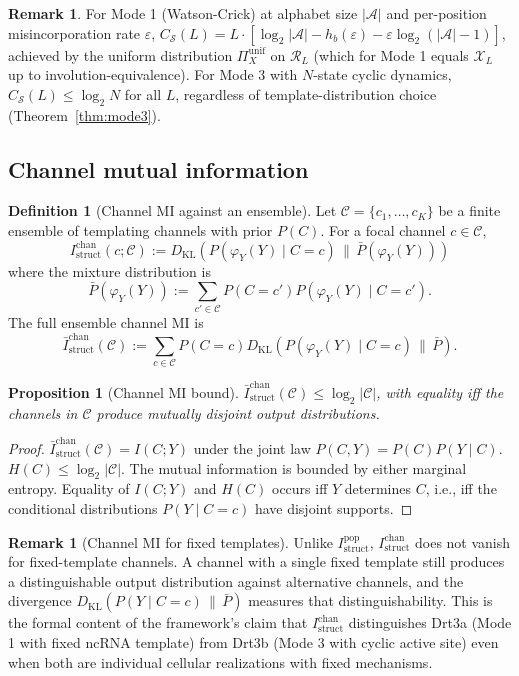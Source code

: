 \documentclass[11pt]{article}
\theoremstyle{plain}
\newtheorem{proposition}[theorem]{Proposition}
\theoremstyle{definition}
\newtheorem{definition}[theorem]{Definition}
\newtheorem{remark}[theorem]{Remark}
\newcommand{\Istructpop}{I_{\mathrm{struct}}^{\mathrm{pop}}}
\newcommand{\Istructchan}{I_{\mathrm{struct}}^{\mathrm{chan}}}
\newcommand{\Csub}{C_{\mathcal{S}}}
\newcommand{\Hbin}{h_b}
\newcommand{\descY}{\varphi_Y}
\newcommand{\KL}[2]{D_{\mathrm{KL}}\!\left(#1 \,\|\, #2\right)}
\begin{document}
\begin{remark}
For Mode 1 (Watson-Crick) at alphabet size $|\mathcal{A}|$ and per-position misincorporation rate $\varepsilon$, $\Csub(L) = L \cdot \left[ \log_2 |\mathcal{A}| - \Hbin(\varepsilon) - \varepsilon \log_2 (|\mathcal{A}| - 1) \right]$, achieved by the uniform distribution $\Pi_X^{\mathrm{unif}}$ on $\mathcal{R}_L$ (which for Mode 1 equals $\mathcal{X}_L$ up to involution-equivalence). For Mode 3 with $N$-state cyclic dynamics, $\Csub(L) \le \log_2 N$ for all $L$, regardless of template-distribution choice (Theorem~\ref{thm:mode3}).
\end{remark}

\subsection{Channel mutual information}

\begin{definition}[Channel MI against an ensemble]
Let $\mathcal{C} = \{c_1, \ldots, c_K\}$ be a finite ensemble of templating channels with prior $P(C)$. For a focal channel $c \in \mathcal{C}$,
\[
\Istructchan(c; \mathcal{C}) := \KL{P(\descY(Y) \mid C = c)}{\bar{P}(\descY(Y))}
\]
where the mixture distribution is
\[
\bar{P}(\descY(Y)) := \sum_{c' \in \mathcal{C}} P(C = c') P(\descY(Y) \mid C = c').
\]
The full ensemble channel MI is
\[
\bar{I}_{\mathrm{struct}}^{\mathrm{chan}}(\mathcal{C}) := \sum_{c \in \mathcal{C}} P(C = c) \KL{P(\descY(Y) \mid C = c)}{\bar{P}}.
\]
\end{definition}

\begin{proposition}[Channel MI bound]
\label{prop:chan_bound}
$\bar{I}_{\mathrm{struct}}^{\mathrm{chan}}(\mathcal{C}) \le \log_2 |\mathcal{C}|$, with equality iff the channels in $\mathcal{C}$ produce mutually disjoint output distributions.
\end{proposition}

\begin{proof}
$\bar{I}_{\mathrm{struct}}^{\mathrm{chan}}(\mathcal{C}) = I(C; Y)$ under the joint law $P(C, Y) = P(C) P(Y \mid C)$. $H(C) \le \log_2 |\mathcal{C}|$. The mutual information is bounded by either marginal entropy. Equality of $I(C; Y)$ and $H(C)$ occurs iff $Y$ determines $C$, i.e., iff the conditional distributions $P(Y \mid C = c)$ have disjoint supports.
\end{proof}

\begin{remark}[Channel MI for fixed templates]
Unlike $\Istructpop$, $\Istructchan$ does not vanish for fixed-template channels. A channel with a single fixed template still produces a distinguishable output distribution against alternative channels, and the divergence $\KL{P(Y \mid C = c)}{\bar{P}}$ measures that distinguishability. This is the formal content of the framework's claim that $\Istructchan$ distinguishes Drt3a (Mode 1 with fixed ncRNA template) from Drt3b (Mode 3 with cyclic active site) even when both are individual cellular realizations with fixed mechanisms.
\end{remark}
\end{document}
